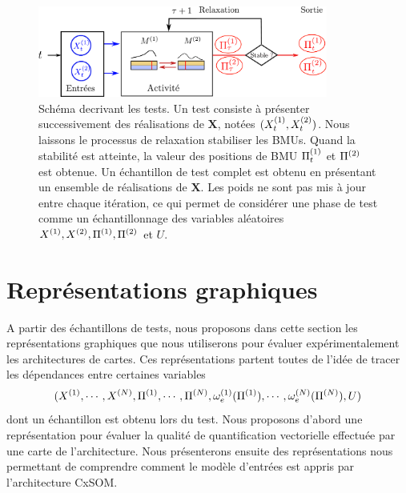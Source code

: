 \begin{figure}
\centering
\includegraphics[width=0.85\textwidth]{tests_2maps.pdf}
\caption{Schéma decrivant les tests. Un test consiste à présenter successivement des réalisations de $\mathbf{X}$, notées $(X^{({1})}_t,X^{({2})}_t)$. Nous laissons le processus de relaxation stabiliser les BMUs. Quand la stabilité est atteinte, la valeur des positions de BMU $\Pi^{({1})}_t$ et $\Pi^{({2})}$ est obtenue. Un échantillon de test complet est obtenu en présentant un ensemble de réalisations de $\mathbf{X}$. Les poids ne sont pas mis à jour entre chaque itération, ce qui permet de considérer une phase de test comme un échantillonnage des variables aléatoires $X^{({1})},X^{({2})}, \Pi^{({1})}, \Pi^{({2})}$ et $U$.}
\label{fig:flowchart}
\end{figure}


\section{Représentations graphiques}
A partir des échantillons de tests, nous proposons dans cette section les représentations graphiques que nous utiliserons pour évaluer expérimentalement les architectures de cartes.
Ces représentations partent toutes de l'idée de tracer les dépendances entre certaines variables $$(X^{({1})}, \cdots, X^{({N})}, \Pi^{({1})}, \cdots, \Pi^{({N})}, \omega_e^{({1})}(\Pi^{({1})}), \cdots, \omega_e^{({N})}(\Pi^{({N})}),U)$$ dont un échantillon est obtenu lors du test.
Nous proposons d'abord une représentation pour évaluer la qualité de quantification vectorielle effectuée par une carte de l'architecture. Nous présenterons ensuite des représentations nous permettant de comprendre comment le modèle d'entrées est appris par l'architecture CxSOM.

